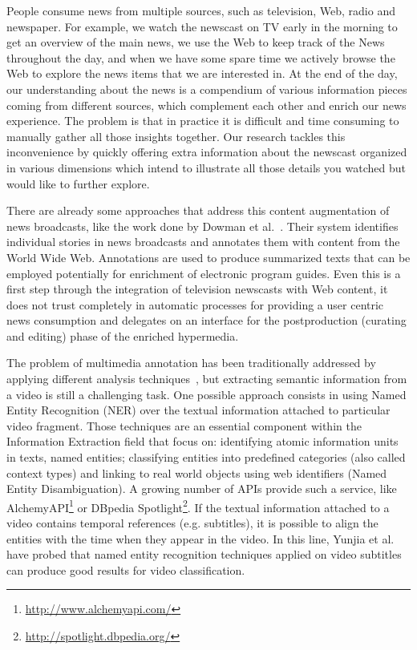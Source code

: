 \documentclass{llncs}
\begin{document}
People consume news from multiple sources, such as television, Web, radio and newspaper. For example, we watch the newscast on TV early in the morning to get an overview of the main news, we use the Web to keep track of the News throughout the day, and when we have some spare time we actively browse the Web to explore the news items that we are interested in. At the end of the day, our understanding about the news is a compendium of various information pieces coming from different sources, which complement each other and enrich our news experience. The problem is that in practice it is difficult and time consuming to manually gather all those insights together. Our research tackles this inconvenience by quickly offering extra information about the newscast organized in various dimensions which intend to illustrate all those details you watched but would like to further explore. 

There are already some approaches that address this content augmentation of news broadcasts, like the work done by Dowman et al.~\cite{DowmanEtAl05c}. Their system identifies individual stories in news broadcasts and annotates them with content from the World Wide Web. Annotations are used to produce summarized texts that can be employed potentially for enrichment of electronic program guides. Even this is a first step through the integration of television newscasts with Web content, it does not trust completely in automatic processes for providing a user centric news consumption and delegates on an interface for the postproduction (curating and editing) phase of the enriched hypermedia.

The problem of multimedia annotation has been traditionally addressed by applying different analysis techniques~\cite{ballan2011event}, but extracting semantic information from a video is still a challenging task. One possible approach consists in using Named Entity Recognition (NER) over the textual information attached to particular video fragment. Those techniques are an essential component within the Information Extraction field that focus on: identifying atomic information units in texts, named entities; classifying entities into predefined categories (also called context types) and linking to real world objects using web identifiers (Named Entity Disambiguation). A growing number of APIs provide such a service, like AlchemyAPI\footnote{\fontsize{8pt}{1em}\selectfont \url{http://www.alchemyapi.com/}} or DBpedia Spotlight\footnote{\fontsize{8pt}{1em}\selectfont \url{http://spotlight.dbpedia.org/}}. If the textual information attached to a video contains temporal references (e.g. subtitles), it is possible to align the entities with the time when they appear in the video. In this line, Yunjia et al.~\cite{yunjia2013} have probed that named entity recognition techniques applied on video subtitles can produce good results for video classification. 
\end{document}
